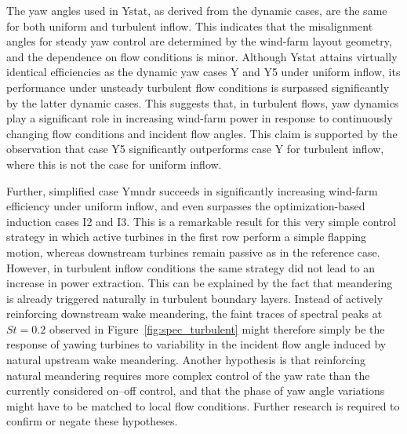 The yaw angles used in Ystat, as derived from the dynamic cases, are the same for both uniform and turbulent inflow. This indicates that the misalignment angles for steady yaw control are determined by the wind-farm layout geometry, and the dependence on flow conditions is minor. Although Ystat attains virtually identical efficiencies as the dynamic yaw cases Y and Y5 under uniform inflow, its performance under unsteady turbulent flow conditions is surpassed significantly by the latter dynamic cases. This suggests that, in turbulent flows, yaw dynamics play a significant role in increasing wind-farm power in response to continuously changing flow conditions and incident flow angles. This claim is supported by the observation that case Y5 significantly outperforms case Y for turbulent inflow, where this is not the case for uniform inflow. 

Further, simplified case Ymndr succeeds in significantly increasing wind-farm efficiency under uniform inflow, and even surpasses the optimization-based induction cases I2 and I3. This is a remarkable result for this very simple control strategy in which active turbines in the first row perform a simple flapping motion, whereas downstream turbines remain passive as in the reference case. However, in turbulent inflow conditions the same strategy did not lead to an increase in power extraction. This can be explained by the fact that meandering is already triggered naturally in turbulent boundary layers. Instead of actively reinforcing downstream wake meandering, the faint traces of spectral peaks at $St = 0.2$ observed in Figure~\ref{fig:spec_turbulent} might therefore simply be the response of yawing turbines to variability in the incident flow angle induced by natural upstream wake meandering. Another hypothesis is that reinforcing natural meandering requires more complex control of the yaw rate than the currently considered on--off control, and that the phase of yaw angle variations might have to be matched to local flow conditions. Further research is required to confirm or negate these hypotheses.

